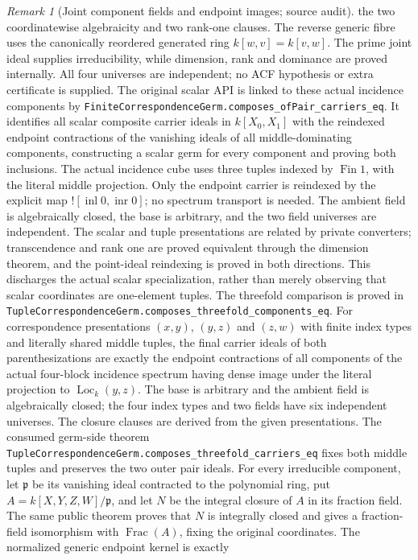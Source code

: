 \documentclass[11pt,oneside]{article}
\theoremstyle{definition}
\theoremstyle{remark}
\newtheorem{remark}[theorem]{Remark}
\newcommand{\Loc}{\operatorname{Loc}}
\newcommand{\lean}[1]{\nolinkurl{#1}}
\begin{document}
\begin{remark}[Joint component fields and endpoint images; source audit]
the two coordinatewise algebraicity and two rank-one clauses.
The reverse generic fibre uses the canonically reordered generated ring
$k[w,v]=k[v,w]$. The prime joint ideal supplies irreducibility, while
dimension, rank and dominance are proved internally. All four universes
are independent; no ACF hypothesis or extra certificate is supplied.
The original scalar API is linked to these actual incidence components by
\lean{FiniteCorrespondenceGerm.composes_ofPair_carriers_eq}. It identifies
all scalar composite carrier ideals in $k[X_0,X_1]$ with the reindexed
endpoint contractions of the vanishing ideals of all middle-dominating
components, constructing a scalar germ for every component and proving
both inclusions. The actual incidence cube uses three tuples indexed by
$\operatorname{Fin}1$, with the literal middle projection. Only the
endpoint carrier is reindexed by the explicit map
$![\operatorname{inl}0,\operatorname{inr}0]$; no spectrum transport is needed.
The ambient field is algebraically closed, the base is arbitrary, and the
two field universes are independent. The scalar and tuple presentations
are related by private converters; transcendence and rank one are proved
equivalent through the dimension theorem, and the point-ideal reindexing
is proved in both directions. This discharges the actual scalar
specialization, rather than merely observing that scalar coordinates are
one-element tuples.
The threefold comparison is proved in
\lean{TupleCorrespondenceGerm.composes_threefold_components_eq}.
For correspondence presentations $(x,y)$, $(y,z)$ and $(z,w)$
with finite index types and literally shared middle tuples, the final carrier ideals of both
parenthesizations are exactly the endpoint contractions of all components
of the actual four-block incidence spectrum having dense image under the
literal projection to $\Loc_k(y,z)$. The base is arbitrary and the ambient
field is algebraically closed; the four index types and two fields have
six independent universes. The closure clauses are derived from the given
presentations. The consumed germ-side theorem
\lean{TupleCorrespondenceGerm.composes_threefold_carriers_eq} fixes both
middle tuples and preserves the two outer pair ideals.
For every irreducible component, let $\mathfrak p$ be its vanishing ideal
contracted to the polynomial ring, put $A=k[X,Y,Z,W]/\mathfrak p$, and let
$N$ be the integral closure of $A$ in its fraction field. The same public
theorem proves that $N$ is integrally closed and gives a
fraction-field isomorphism with $\operatorname{Frac}(A)$, fixing the
original coordinates. The normalized generic endpoint kernel is exactly

\end{remark}
\end{document}
